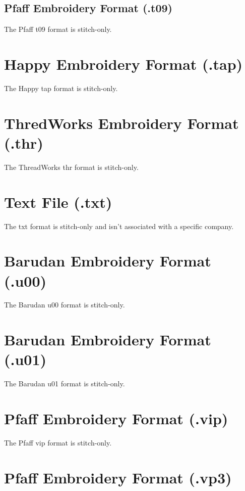 \documentclass{report}
\begin{document}
\subsection{Pfaff Embroidery Format (.t09)}

The Pfaff t09 format is stitch-only.

\section{Happy Embroidery Format (.tap)}

The Happy tap format is stitch-only.

\section{ThredWorks Embroidery Format (.thr)}

The ThreadWorks thr format is stitch-only.

\section{Text File (.txt)}

The txt format is stitch-only and isn't associated with a specific company.

\section{Barudan Embroidery Format (.u00)}

The Barudan u00 format is stitch-only.

\section{Barudan Embroidery Format (.u01)}

The Barudan u01 format is stitch-only.

\section{Pfaff Embroidery Format (.vip)}

The Pfaff vip format is stitch-only.

\section{Pfaff Embroidery Format (.vp3)}
\end{document}
